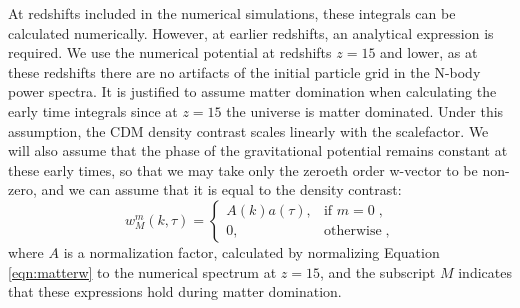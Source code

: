 \documentclass[twocolumn,superscriptaddress,prd]{revtex4}
\begin{document}
At redshifts included in the numerical simulations, these integrals
can be calculated numerically.  However, at earlier redshifts, an
analytical expression is required.  We use the numerical potential at
redshifts $z=15$ and lower, as at these redshifts there are no
artifacts of the initial particle grid in the N-body power spectra.
It is justified to assume matter domination when calculating the early
time integrals since at $z=15$ the universe is matter dominated.
Under this assumption, the CDM density contrast scales linearly with
the scalefactor.  We will also assume that the phase of the gravitational potential
remains constant at these early times, so that we may take only the
zeroeth order w-vector to be non-zero, and we can assume that it is
equal to the density contrast:
\begin{equation}\label{eqn:matterw}
  w_M^m(k,\tau) = \begin{cases} 
    A(k) a(\tau), & \text{if } m = 0\;, \\
    0, & \text{otherwise} \;,
  \end{cases}
\end{equation}
where $A$ is a normalization factor, calculated by normalizing
Equation \eqref{eqn:matterw} to the numerical spectrum at $z=15$, and
the subscript $M$ indicates that these expressions hold during matter domination.  
\end{document}
